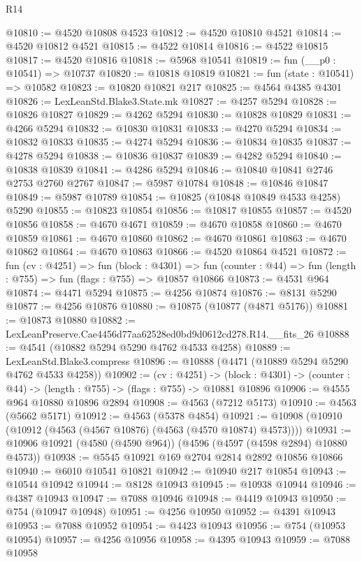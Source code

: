\begin{lexlean}{R14}
\begin{coremodule}
@10810 := @4520 @10808 @4523
@10812 := @4520 @10810 @4521
@10814 := @4520 @10812 @4521
@10815 := @4522 @10814
@10816 := @4522 @10815
@10817 := @4520 @10816
@10818 := @5968 @10541
@10819 := fun (__p0 : @10541) => @10737
@10820 := @10818 @10819
@10821 := fun (state : @10541) => @10582
@10823 := @10820 @10821 @217
@10825 := @4564 @4385 @4301
@10826 := LexLeanStd.Blake3.State.mk
@10827 := @4257 @5294
@10828 := @10826 @10827
@10829 := @4262 @5294
@10830 := @10828 @10829
@10831 := @4266 @5294
@10832 := @10830 @10831
@10833 := @4270 @5294
@10834 := @10832 @10833
@10835 := @4274 @5294
@10836 := @10834 @10835
@10837 := @4278 @5294
@10838 := @10836 @10837
@10839 := @4282 @5294
@10840 := @10838 @10839
@10841 := @4286 @5294
@10846 := @10840 @10841 @2746 @2753 @2760 @2767
@10847 := @5987 @10784
@10848 := @10846 @10847
@10849 := @5987 @10789
@10854 := @10825 (@10848 @10849 @4533 @4258) @5290
@10855 := @10823 @10854
@10856 := @10817 @10855
@10857 := @4520 @10856
@10858 := @4670 @4671
@10859 := @4670 @10858
@10860 := @4670 @10859
@10861 := @4670 @10860
@10862 := @4670 @10861
@10863 := @4670 @10862
@10864 := @4670 @10863
@10866 := @4520 @10864 @4521
@10872 := fun (cv : @4251) =>
  fun (block : @4301) =>
  fun (counter : @44) => fun (length : @755) => fun (flags : @755) => @10857 @10866
@10873 := @4531 @964
@10874 := @4471 @5294
@10875 := @4256 @10874
@10876 := @8131 @5290
@10877 := @4256 @10876
@10880 := @10875 (@10877 (@4871 @5176))
@10881 := @10873 @10880
@10882 := LexLeanPreserve.Cae4456d77aa62528ed0bd9d0612cd278.R14.__fits_26
@10888 := @4541 (@10882 @5294 @5290 @4762 @4533 @4258)
@10889 := LexLeanStd.Blake3.compress
@10896 := @10888 (@4471 (@10889 @5294 @5290 @4762 @4533 @4258))
@10902 := (cv : @4251) ->
  (block : @4301) -> (counter : @44) -> (length : @755) -> (flags : @755) -> @10881 @10896
@10906 := @4555 @964 @10880 @10896 @2894
@10908 := @4563 (@7212 @5173)
@10910 := @4563 (@5662 @5171)
@10912 := @4563 (@5378 @4854)
@10921 := @10908 (@10910 (@10912 (@4563 (@4567 @10876) (@4563 (@4570 @10874) @4573))))
@10931 := @10906 @10921 (@4580 (@4590 @964)) (@4596 (@4597 (@4598 @2894) @10880 @4573))
@10938 := @5545 @10921 @169 @2704 @2814 @2892 @10856 @10866
@10940 := @6010 @10541 @10821
@10942 := @10940 @217 @10854
@10943 := @10544 @10942
@10944 := @8128 @10943
@10945 := @10938 @10944
@10946 := @4387 @10943
@10947 := @7088 @10946
@10948 := @4419 @10943
@10950 := @754 (@10947 @10948)
@10951 := @4256 @10950
@10952 := @4391 @10943
@10953 := @7088 @10952
@10954 := @4423 @10943
@10956 := @754 (@10953 @10954)
@10957 := @4256 @10956
@10958 := @4395 @10943
@10959 := @7088 @10958

\end{coremodule}
\end{lexlean}
